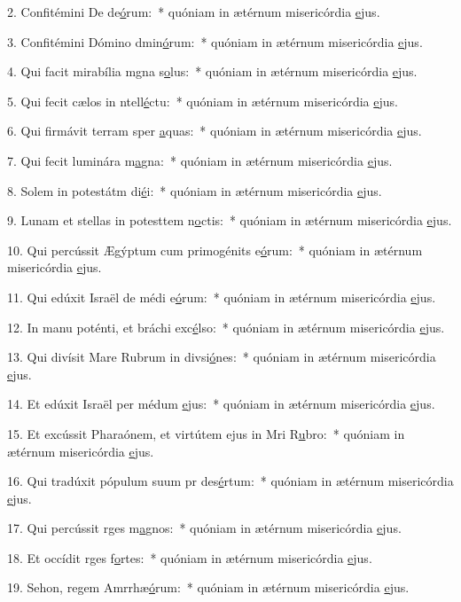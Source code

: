 2. Confitémini De de\uline{ó}rum:~* quóniam in ætérnum misericórdia \uline{e}jus.\par 
3. Confitémini Dómino dmin\uline{ó}rum:~* quóniam in ætérnum misericórdia \uline{e}jus.\par 
4. Qui facit mirabília mgna s\uline{o}lus:~* quóniam in ætérnum misericórdia \uline{e}jus.\par 
5. Qui fecit cælos in ntell\uline{é}ctu:~* quóniam in ætérnum misericórdia \uline{e}jus.\par 
6. Qui firmávit terram sper \uline{a}quas:~* quóniam in ætérnum misericórdia \uline{e}jus.\par 
7. Qui fecit luminára m\uline{a}gna:~* quóniam in ætérnum misericórdia \uline{e}jus.\par 
8. Solem in potestátm di\uline{é}i:~* quóniam in ætérnum misericórdia \uline{e}jus.\par 
9. Lunam et stellas in potesttem n\uline{o}ctis:~* quóniam in ætérnum misericórdia \uline{e}jus.\par 
10. Qui percússit Ægýptum cum primogénits e\uline{ó}rum:~* quóniam in ætérnum misericórdia \uline{e}jus.\par 
11. Qui edúxit Israël de médi e\uline{ó}rum:~* quóniam in ætérnum misericórdia \uline{e}jus.\par 
12. In manu poténti, et bráchi exc\uline{é}lso:~* quóniam in ætérnum misericórdia \uline{e}jus.\par 
13. Qui divísit Mare Rubrum in divsi\uline{ó}nes:~* quóniam in ætérnum misericórdia \uline{e}jus.\par 
14. Et edúxit Israël per médum \uline{e}jus:~* quóniam in ætérnum misericórdia \uline{e}jus.\par 
15. Et excússit Pharaónem, et virtútem ejus in Mri R\uline{u}bro:~* quóniam in ætérnum misericórdia \uline{e}jus.\par 
16. Qui tradúxit pópulum suum pr des\uline{é}rtum:~* quóniam in ætérnum misericórdia \uline{e}jus.\par 
17. Qui percússit rges m\uline{a}gnos:~* quóniam in ætérnum misericórdia \uline{e}jus.\par 
18. Et occídit rges f\uline{o}rtes:~* quóniam in ætérnum misericórdia \uline{e}jus.\par 
19. Sehon, regem Amrrhæ\uline{ó}rum:~* quóniam in ætérnum misericórdia \uline{e}jus.\par 
